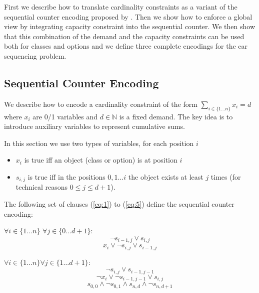 \documentclass[]{llncs}
\begin{document}
First we describe how to translate cardinality constraints as a variant of the sequential counter encoding proposed by
\cite{Sinz05}. Then we show how to enforce a global view by integrating capacity constraint into the sequential counter.
We then show that this combination of the demand and the capacity constraints can be used both for classes and options
and we define three complete encodings for the car sequencing problem. 

\subsection{Sequential Counter Encoding}
\label{sub:card}

We describe how to encode a cardinality constraint of the form $ \sum_{i\in \{1\ldots n\}} x_{i} = d $ where $x_i$ are
0/1 variables and $d\in \mathbb{N}$ is a fixed demand. The key idea is to introduce auxiliary variables to represent
cumulative sums.

In this section we use two types of variables, for each position $i$

\begin{itemize}
    \item  $x_i$ is true iff an object (class or option) is at position $i$
    \item  $s_{i,j}$ is true iff in the positions $0,1 \ldots i$ the object exists at least $j$ times (for technical
        reasons $0 \leq j \leq d+1$). 
\end{itemize} 

The following set of clauses (\ref{eq:1}) to (\ref{eq:5}) define the sequential counter encoding:

$\forall i \in \{1\ldots n\}$ $\forall j \in\{0 \ldots d+1\}$: 
\begin{equation} \label{eq:1}
    \neg s_{i-1,j} \vee s_{i,j}
\end{equation}
\begin{equation} \label{eq:2}
    x_{i} \vee \neg s_{i,j} \vee s_{i-1,j}
\end{equation}

$\forall {i \in \{1\ldots n\}} \forall {j\in \{1\ldots d+1\}}$: 
\begin{equation} \label{eq:3}
    \neg s_{i,j} \vee s_{i-1,j-1}
\end{equation}
\begin{equation} \label{eq:4}
    \neg x_{i} \vee \neg s_{i-1,j-1} \vee s_{i,j}
\end{equation}
\begin{equation} \label{eq:5}
     s_{0,0} \wedge \neg s_{0,1} \wedge s_{n,d} \wedge \neg s_{n,d+1}
\end{equation}
\end{document}
